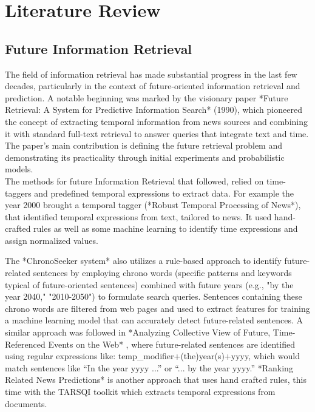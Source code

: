 \documentclass[a4paper,10pt]{report} %
\begin{document}
\chapter{Literature Review}

\section{Future Information Retrieval}
The field of information retrieval has made substantial progress in the last few decades, particularly in the context of future-oriented information retrieval and prediction. A notable beginning was marked by the visionary paper *Future Retrieval: A System for Predictive Information Search* (1990), which pioneered the concept of extracting temporal information from news sources and combining it with standard full-text retrieval to answer queries that integrate text and time. The paper's main contribution is defining the future retrieval problem and demonstrating its practicality through initial experiments and probabilistic models. \\

The methods for future Information Retrieval that followed, relied on time-taggers and predefined temporal expressions to extract data.
For example the year 2000 brought a temporal tagger (*Robust Temporal Processing of News*), that identified temporal expressions from text, tailored to news. It used hand-crafted rules as well as some machine learning to identify time expressions and assign normalized values.

The *ChronoSeeker system* also utilizes a rule-based approach to identify future-related sentences by employing chrono words (specific patterns and keywords typical of future-oriented sentences) combined with future years (e.g., "by the year 2040," "2010-2050") to formulate search queries. Sentences containing these chrono words are filtered from web pages and used to extract features for training a machine learning model that can accurately detect future-related sentences.
A similar approach was followed in *Analyzing Collective View of Future, Time-Referenced Events on the Web* , where future-related sentences are identified using regular expressions like: temp\_modifier+(the)year(s)+yyyy, which would match sentences like “In the year yyyy ...” or “... by the year yyyy.” 
*Ranking Related News Predictions* is another approach that uses hand crafted rules, this time with the TARSQI toolkit which extracts temporal expressions from documents. \\
\end{document}
